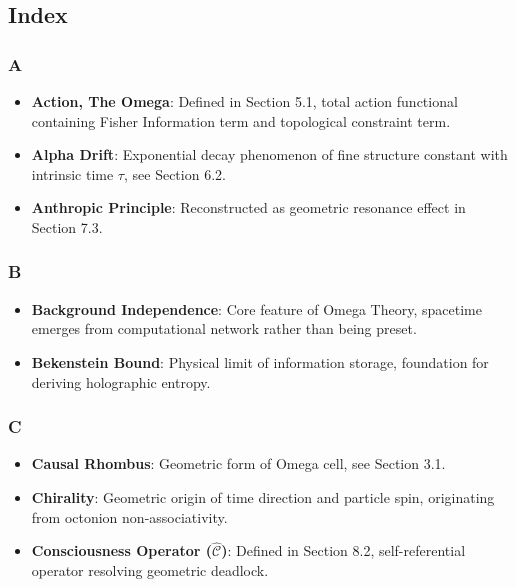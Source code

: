\subsection{Index}

\subsubsection{A}

\begin{itemize}
\item \textbf{Action, The Omega}: Defined in Section 5.1, total action functional containing Fisher Information term and topological constraint term.
\item \textbf{Alpha Drift}: Exponential decay phenomenon of fine structure constant with intrinsic time $\tau$, see Section 6.2.
\item \textbf{Anthropic Principle}: Reconstructed as geometric resonance effect in Section 7.3.
\end{itemize}

\subsubsection{B}

\begin{itemize}
\item \textbf{Background Independence}: Core feature of Omega Theory, spacetime emerges from computational network rather than being preset.
\item \textbf{Bekenstein Bound}: Physical limit of information storage, foundation for deriving holographic entropy.
\end{itemize}

\subsubsection{C}

\begin{itemize}
\item \textbf{Causal Rhombus}: Geometric form of Omega cell, see Section 3.1.
\item \textbf{Chirality}: Geometric origin of time direction and particle spin, originating from octonion non-associativity.
\item \textbf{Consciousness Operator ($\hat{\mathcal{C}}$)}: Defined in Section 8.2, self-referential operator resolving geometric deadlock.
\end{itemize}

